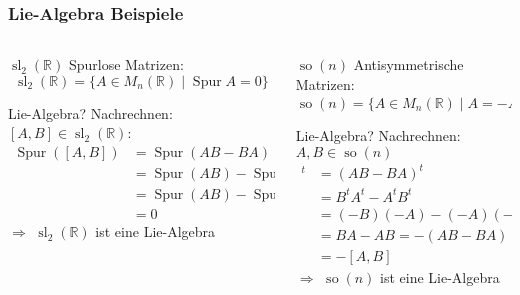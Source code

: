 %
%
%
\bgroup
\begin{frame}[t]
\setlength{\abovedisplayskip}{5pt}
\setlength{\belowdisplayskip}{5pt}
\frametitle{Lie-Algebra Beispiele}
\vspace{-20pt}
\begin{columns}[t,onlytextwidth]
\begin{column}{0.48\textwidth}
\begin{block}{$\operatorname{sl}_2(\mathbb{R})$}
Spurlose Matrizen:
\[
\operatorname{sl}_2(\mathbb{R})
=
\{A\in M_n(\mathbb{R})\;|\; \operatorname{Spur}A=0\}
\]
\end{block}
\begin{block}{Lie-Algebra?}
Nachrechnen: $[A,B]\in \operatorname{sl}_2(\mathbb{R})$:
\begin{align*}
\operatorname{Spur}([A,B])
&=
\operatorname{Spur}(AB-BA)
\\
&=
\operatorname{Spur}(AB)-\operatorname{Spur}(BA)
\\
&=
\operatorname{Spur}(AB)-\operatorname{Spur}(AB)
\\
&=0
\end{align*}
$\Rightarrow$ $\operatorname{sl}_2(\mathbb{R})$ ist eine Lie-Algebra
\end{block}
\end{column}
\begin{column}{0.48\textwidth}
\begin{block}{$\operatorname{so}(n)$}
Antisymmetrische Matrizen:
\[
\operatorname{so}(n)
=
\{A\in M_n(\mathbb{R})
\;|\;
A=-A^t
\}
\]
\end{block}
\begin{block}{Lie-Algebra?}
Nachrechnen: $A,B\in \operatorname{so}(n)$
\begin{align*}
[A,B]^t
&=
(AB-BA)^t
\\
&=
B^tA^t - A^tB^t
\\
&=
(-B)(-A)-(-A)(-B)
\\
&=
BA-AB
=
-(AB-BA)
\\
&=
-[A,B]
\end{align*}
$\Rightarrow$ $\operatorname{so}(n)$ ist eine Lie-Algebra
\end{block}
\end{column}
\end{columns}
\end{frame}
\egroup
